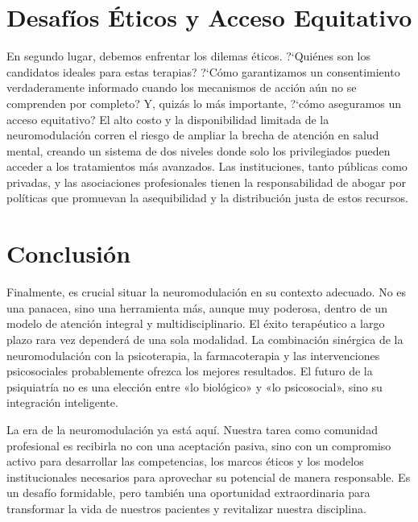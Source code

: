 \documentclass{apm-editorial}
\begin{document}
\section*{Desaf\'ios \'Eticos y Acceso Equitativo}

En segundo lugar, debemos enfrentar los dilemas \'eticos. ?`Qui\'enes
son los candidatos ideales para estas terapias? ?`C\'omo garantizamos
un consentimiento verdaderamente informado cuando los mecanismos de
acci\'on a\'un no se comprenden por completo? Y, quiz\'as lo m\'as
importante, ?`c\'omo aseguramos un acceso equitativo? El alto costo y
la disponibilidad limitada de la neuromodulaci\'on corren el riesgo de
ampliar la brecha de atenci\'on en salud mental, creando un sistema de
dos niveles donde solo los privilegiados pueden acceder a los
tratamientos m\'as avanzados. Las instituciones, tanto p\'ublicas como
privadas, y las asociaciones profesionales tienen la responsabilidad de
abogar por pol\'iticas que promuevan la asequibilidad y la
distribuci\'on justa de estos recursos.

\section*{Conclusi\'on}

Finalmente, es crucial situar la neuromodulaci\'on en su contexto
adecuado. No es una panacea, sino una herramienta m\'as, aunque muy
poderosa, dentro de un modelo de atenci\'on integral y
multidisciplinario. El \'exito terap\'eutico a largo plazo rara vez
depender\'a de una sola modalidad. La combinaci\'on sin\'ergica de la
neuromodulaci\'on con la psicoterapia, la farmacoterapia y las
intervenciones psicosociales probablemente ofrezca los mejores
resultados. El futuro de la psiquiatr\'ia no es una elecci\'on entre
«lo biol\'ogico» y «lo psicosocial», sino su integraci\'on inteligente.

La era de la neuromodulaci\'on ya est\'a aqu\'i. Nuestra tarea como
comunidad profesional es recibirla no con una aceptaci\'on pasiva, sino
con un compromiso activo para desarrollar las competencias, los marcos
\'eticos y los modelos institucionales necesarios para aprovechar su
potencial de manera responsable. Es un desaf\'io formidable, pero
tambi\'en una oportunidad extraordinaria para transformar la vida de
nuestros pacientes y revitalizar nuestra disciplina.

\end{document}
